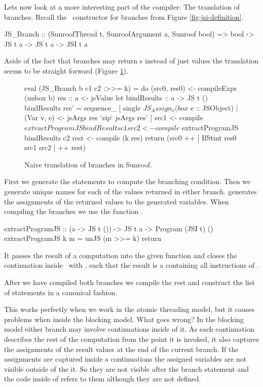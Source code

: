 Lets now look at a more interesting part of the compiler: The translation of 
branches.
Recall the \JSI~constructor for branches from Figure \ref{fig:jsi-definition}.
\begin{Code}
JS_Branch :: (SunroofThread t, SunroofArgument a, Sunroof bool) 
          => bool -> JS t a -> JS t a  -> JSI t a
\end{Code}
Aside of the fact that branches may return s
instead of just  values the translation seems to 
be straight forward (Figure \ref{fig:branch-translation}).
\begin{figure}[h]
\begin{Code}
eval (JS_Branch b c1 c2 :>>= k) = do
  (src0, res0) <- compileExpr (unbox b)
  res :: a <- jsValue
  let bindResults :: a -> JS t ()
      bindResults res' =
        sequence_ [ single $ JS_Assign_ v (box $ e :: JSObject)
                  | (Var v, e) <- jsArgs res `zip` jsArgs res' ]
  src1 <- compile $ extractProgramJS bindResults c1
  src2 <- compile $ extractProgramJS bindResults c2
  rest <- compile (k res)
  return (src0 ++ [ IfStmt res0 src1 src2 ] ++ rest)
\end{Code}
\caption{Naive translation of branches in Sunroof.}
\label{fig:branch-translation}
\end{figure}
First we generate the statements to compute the branching condition.
Then we generate unique names for each of the values returned in 
either branch.  generates the assignments of
the returned values to the generated variables. When compiling 
the branches we use the function .
\begin{Code}
extractProgramJS :: (a -> JS t ()) -> JS t a -> Program (JSI t) ()
extractProgramJS k m = unJS (m >>= k) return
\end{Code}
It passes the result of a computation  
into the given function  and
closes the continuation inside \JS~with ,
such that the result is a  containing
all instructions of .

After we have compiled both branches we compile the rest and
construct the list of statements in a canonical fashion.

This works perfectly when we work in the atomic threading model,
but it causes problems when inside the blocking model. 
What goes wrong? In the blocking model either branch 
may involve continuations inside of it. As each 
continuation describes the rest of the computation from
the point it is invoked, it also captures the 
assignments of the result values at the end of the
current branch. If the assignments are captured inside a continuations
the assigned variables are not visible outside of the 
it. So they are not visible after the branch
statement and the code inside of  refers to them
although they are not defined.

